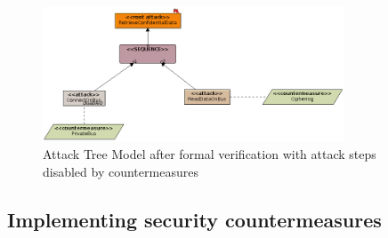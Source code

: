 \documentclass[12pt]{article}
\begin{document}
\begin{figure}[htbp]
\centering
\includegraphics[width=0.8\textwidth]{fig/attacktree_verif2.png}
\caption{Attack Tree Model after formal verification with attack steps disabled by countermeasures} \label{fig:attacktree_verif2}
\end{figure}

\subsection{Implementing security countermeasures}
\end{document}
